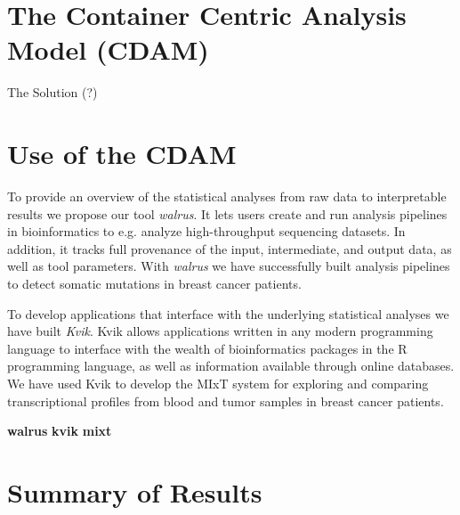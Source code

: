 \section{The Container Centric Analysis Model (CDAM)} 
    The Solution (?) 

\section{Use of the CDAM} 

To provide an overview of the statistical analyses from raw data to
interpretable results we propose our tool \emph{walrus}. It lets users create
and run analysis pipelines in bioinformatics to e.g. analyze high-throughput
sequencing datasets. In addition, it tracks full provenance of the input,
intermediate, and output data, as well as tool parameters. With \emph{walrus} we
have successfully built analysis pipelines to detect somatic mutations in breast
cancer patients. 

To develop applications that interface with the underlying statistical analyses
we have built \emph{Kvik}. Kvik allows applications written in any modern
programming language to interface with the wealth of bioinformatics packages in
the R programming language, as well as information available through online
databases. We have used Kvik to develop the MIxT system for exploring and
comparing transcriptional profiles from blood and tumor samples in breast cancer
patients. 


\textbf{walrus}
\textbf{kvik} 
\textbf{mixt} 

\section{Summary of Results} 

